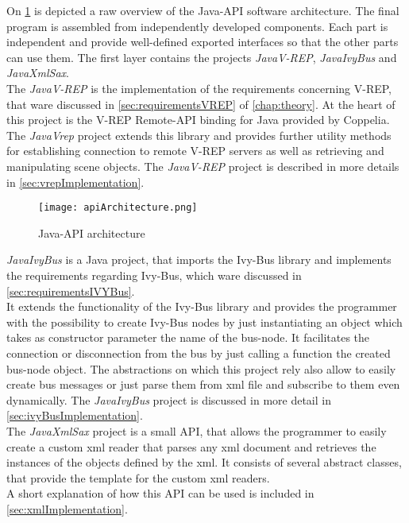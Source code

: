On \ref{fig:apiArchitecture} is depicted a raw overview of the Java-API software architecture.
The final program is assembled from independently developed components. Each part is independent and provide well-defined exported interfaces so that the other parts can use them.
The first layer contains the projects \textit{JavaV-REP}, \textit{JavaIvyBus} and \textit{JavaXmlSax}.\\
The \textit{JavaV-REP} is the implementation of the requirements concerning V-REP, that ware discussed in \ref{sec:requirementsVREP} of \ref{chap:theory}. 
At the heart of this project is the V-REP Remote-API binding for Java provided by Coppelia. 
The \textit{JavaVrep} project extends this library and provides further utility methods for establishing connection to remote V-REP servers as well as retrieving and manipulating scene objects. The \textit{JavaV-REP} project is described in more details in \ref{sec:vrepImplementation}.\\

\begin{figure}[h!]
	\centering
	\texttt{[image: apiArchitecture.png]}
  \caption{Java-API architecture\label{fig:apiArchitecture}}
\end{figure}

\textit{JavaIvyBus} is a Java project, that imports the Ivy-Bus library and implements the requirements regarding Ivy-Bus, which ware discussed in \ref{sec:requirementsIVYBus}.\\ 
It extends the functionality of the  Ivy-Bus library and provides the programmer with the possibility to create Ivy-Bus nodes by just instantiating an object which takes as constructor parameter the name of the bus-node. 
It facilitates the connection or disconnection from the bus by just calling a function the created bus-node object. 
The abstractions on which this project rely also allow to easily create bus messages or just parse them from xml file and subscribe to them even dynamically. The \textit{JavaIvyBus} project is discussed in more detail in \ref{sec:ivyBusImplementation}. \\

The \textit{JavaXmlSax} project is a small API, that allows the programmer to easily create a custom xml reader that parses any xml document and retrieves the instances of the objects defined by the xml. It consists of several abstract classes, that provide the template for the custom xml readers.\\
A short explanation of how this API can be used is included in \ref{sec:xmlImplementation}. \\

